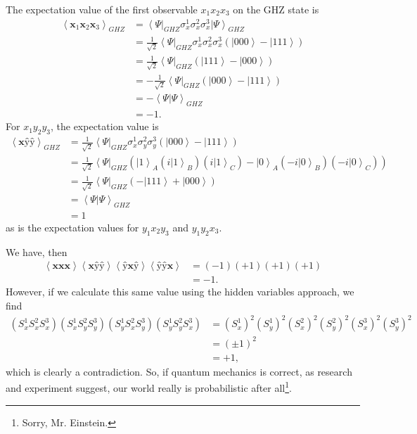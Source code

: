 \documentclass[11pt]{article} %
\newcommand{\bra}[1]{\left\langle #1 \right|}
\newcommand{\ket}[1]{\left|#1\right\rangle}
\newcommand{\braket}[2]{\left\langle#1 |  #2\right\rangle}
\begin{document}
The expectation value of the first observable $x_1x_2x_3$ on the GHZ state is
\begin{align}
    \left<\textbf{\^x}_1\textbf{\^x}_2\textbf{\^x}_3\right>_{GHZ} &= \bra{\Psi}_{GHZ}\sigma^1_x\sigma^2_x\sigma^3_x\ket{\Psi}_{GHZ}\\
    &= \frac{1}{\sqrt{2}}\bra{\Psi}_{GHZ}\sigma^1_x\sigma^2_x\sigma^3_x\left(\ket{000} - \ket{111}\right)\nonumber\\
    &= \frac{1}{\sqrt{2}}\bra{\Psi}_{GHZ}\left(\ket{111} - \ket{000}\right)\nonumber\\
    &= -\frac{1}{\sqrt{2}}\bra{\Psi}_{GHZ}\left(\ket{000} - \ket{111}\right)\nonumber\\
    &= -\braket{\Psi}{\Psi}_{GHZ}\nonumber\\
    &= -1.
\end{align}
For $x_1y_2y_3$, the expectation value is
\begin{align}
    \left<\textbf{\^x}\textbf{\^y}\textbf{\^y}\right>_{GHZ} &= \frac{1}{\sqrt{2}}\bra{\Psi}_{GHZ}\sigma^1_x\sigma^2_y\sigma^3_y\left(\ket{000} - \ket{111}\right)\nonumber\\
    &= \frac{1}{\sqrt{2}}\bra{\Psi}_{GHZ}\left(\ket{1}_A\left(i\ket{1}_B\right)\left(i\ket{1}_C\right) - \ket{0}_A\left(-i\ket{0}_B\right)\left(-i\ket{0}_C\right)\right)\nonumber\\
    &= \frac{1}{\sqrt{2}}\bra{\Psi}_{GHZ}\left(-\ket{111} + \ket{000}\right)\nonumber\\
    &= \braket{\Psi}{\Psi}_{GHZ}\nonumber\\
    &= 1
\end{align}
as is the expectation values for $y_1x_2y_3$ and $y_1y_2x_3$.

We have, then
\begin{align}
    \left<\textbf{\^x}\textbf{\^x}\textbf{\^x}\right>\left<\textbf{\^x}\textbf{\^y}\textbf{\^y}\right>\left<\textbf{\^y}\textbf{\^x}\textbf{\^y}\right>\left<\textbf{\^y}\textbf{\^y}\textbf{\^x}\right> &= (-1)(+1)(+1)(+1)\nonumber\\
    &= -1.
\end{align}
However, if we calculate this same value using the hidden variables approach, we find
\begin{align}
    \left(S^1_xS^2_xS^3_x\right)\left(S^1_xS^2_yS^3_y\right)\left(S^1_yS^2_xS^3_y\right)\left(S^1_yS^2_yS^3_x\right) &= \left(S^1_x\right)^2\left(S^1_y\right)^2\left(S^2_x\right)^2\left(S^2_y\right)^2\left(S^3_x\right)^2\left(S^3_y\right)^2\nonumber\\
    &= (\pm1)^2\nonumber\\
    &= +1,
\end{align}
which is clearly a contradiction. So, if quantum mechanics is correct, as research and experiment suggest, our world really is probabilistic after all\footnote{Sorry, Mr. Einstein.}.
\end{document}
